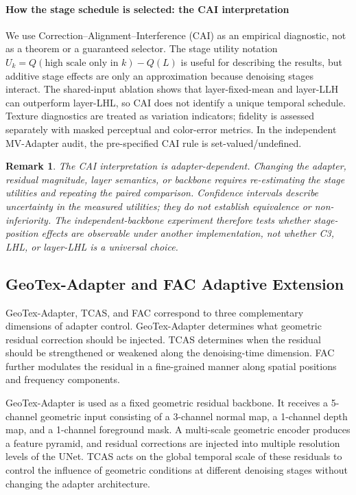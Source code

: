 \documentclass[times,twocolumn,final]{elsarticle}
\newtheorem{remark}{Remark}
\begin{document}
\paragraph{How the stage schedule is selected: the CAI interpretation}
We use Correction--Alignment--Interference (CAI) as an empirical diagnostic, not as a theorem or a guaranteed selector. The stage utility notation $U_k=Q(\text{high scale only in }k)-Q(L)$ is useful for describing the results, but additive stage effects are only an approximation because denoising stages interact. The shared-input ablation shows that layer-fixed-mean and layer-LLH can outperform layer-LHL, so CAI does not identify a unique temporal schedule. Texture diagnostics are treated as variation indicators; fidelity is assessed separately with masked perceptual and color-error metrics. In the independent MV-Adapter audit, the pre-specified CAI rule is set-valued/undefined.

\begin{remark}
The CAI interpretation is adapter-dependent. Changing the adapter, residual magnitude, layer semantics, or backbone requires re-estimating the stage utilities and repeating the paired comparison. Confidence intervals describe uncertainty in the measured utilities; they do not establish equivalence or non-inferiority. The independent-backbone experiment therefore tests whether stage-position effects are observable under another implementation, not whether C3, LHL, or layer-LHL is a universal choice.
\end{remark}

\subsection{GeoTex-Adapter and FAC Adaptive Extension}
\label{subsec:fac}

GeoTex-Adapter, TCAS, and FAC correspond to three complementary dimensions of adapter control. GeoTex-Adapter determines what geometric residual correction should be injected. TCAS determines when the residual should be strengthened or weakened along the denoising-time dimension. FAC further modulates the residual in a fine-grained manner along spatial positions and frequency components.

GeoTex-Adapter is used as a fixed geometric residual backbone. It receives a 5-channel geometric input consisting of a 3-channel normal map, a 1-channel depth map, and a 1-channel foreground mask. A multi-scale geometric encoder produces a feature pyramid, and residual corrections are injected into multiple resolution levels of the UNet. TCAS acts on the global temporal scale of these residuals to control the influence of geometric conditions at different denoising stages without changing the adapter architecture.
\end{document}
